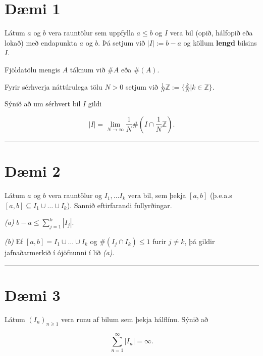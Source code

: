 \documentclass[]{book}
\begin{document}
\hypertarget{dmi-1-1}{%
\section*{Dæmi 1}\label{dmi-1-1}}

Látum \(a\) og \(b\) vera rauntölur sem uppfylla \(a \leq b\) og \(I\) vera bil (opið, hálfopið eða lokað) með endapunkta \(a\) og \(b\). Þá setjum við \(|I| := b - a\) og köllum \textbf{lengd} bilsins \(I\).

Fjöldatölu mengis \(A\) táknum við \(\#A\) eða \(\#(A)\).

Fyrir sérhverja náttúrulega tölu \(N > 0\) setjum við \(\frac1N\mathbb Z := \{\frac kN | k \in \mathbb Z\}\).

Sýnið að um sérhvert bil \(I\) gildi

\[
|I| = \lim_{N\rightarrow\infty}\frac1N\#\left(I\cap\frac1N\mathbb Z \right).
\]

\begin{center}\rule{0.5\linewidth}{\linethickness}\end{center}

\hypertarget{dmi-2-1}{%
\section*{Dæmi 2}\label{dmi-2-1}}

Látum \(a\) og \(b\) vera rauntölur og \(I_1, \dots I_k\) vera bil, sem þekja \([a, b]\) (þ.e.a.s \([a,b] \subseteq I_1\cup \dots\cup I_k\)). Sannið eftirfarandi fullyrðingar.

\emph{(a)} \(b - a \leq \sum_{j=1}^k|I_j|.\)

\emph{(b)} Ef \([a, b] = I_1\cup\dots\cup I_k\) og \(\#(I_j\cap I_k) \leq 1\) furir \(j\neq k\), þá gildir jafnaðarmerkið í ójöfnunni í lið \emph{(a)}.

\begin{center}\rule{0.5\linewidth}{\linethickness}\end{center}

\hypertarget{dmi-3-1}{%
\section*{Dæmi 3}\label{dmi-3-1}}

Látum \((I_n)_{n\geq1}\) vera runu af bilum sem þekja hálflínu. Sýnið að

\[
\sum_{n=1}^\infty|I_n| = \infty.
\]
\end{document}
